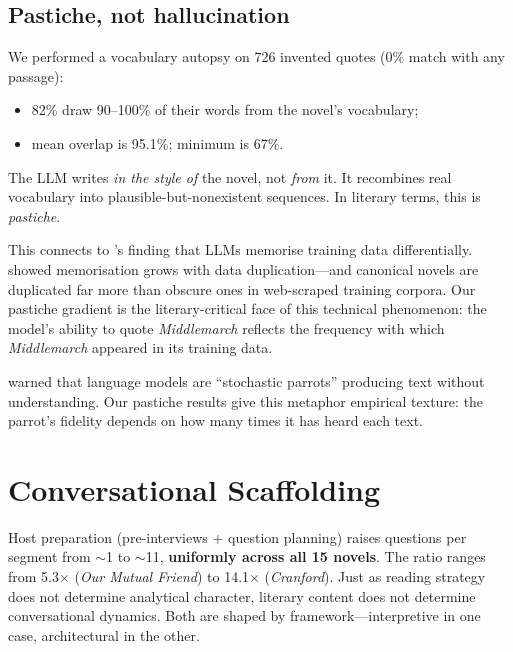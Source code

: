 \documentclass{article}
\begin{document}
\subsection{Pastiche, not hallucination}

We performed a vocabulary autopsy on 726 invented quotes (0\% match
with any passage):

\begin{itemize}
\item 82\% draw 90--100\% of their words from the novel's vocabulary;
\item mean overlap is 95.1\%; minimum is 67\%.
\end{itemize}

The LLM writes \emph{in the style of} the novel, not \emph{from} it.
It recombines real vocabulary into plausible-but-nonexistent sequences.
In literary terms, this is \emph{pastiche}.

This connects to \textcite{carlini2021extracting}'s finding that LLMs
memorise training data differentially.
\textcite{carlini2023quantifying} showed memorisation grows with data
duplication---and canonical novels are duplicated far more than obscure
ones in web-scraped training corpora.  Our pastiche gradient is the
literary-critical face of this technical phenomenon: the model's
ability to quote \emph{Middlemarch} reflects the frequency with which
\emph{Middlemarch} appeared in its training data.

\textcite{bender2021dangers} warned that language models are
``stochastic parrots'' producing text without understanding.  Our
pastiche results give this metaphor empirical texture: the parrot's
fidelity depends on how many times it has heard each text.


\section{Conversational Scaffolding}
\label{sec:scaffolding}

Host preparation (pre-interviews + question planning) raises questions
per segment from $\sim$1 to $\sim$11, \textbf{uniformly across all 15
novels}.  The ratio ranges from 5.3$\times$ (\emph{Our Mutual Friend})
to 14.1$\times$ (\emph{Cranford}).  Just as reading strategy does not
determine analytical character, literary content does not determine
conversational dynamics.  Both are shaped by framework---interpretive
in one case, architectural in the other.
\end{document}
